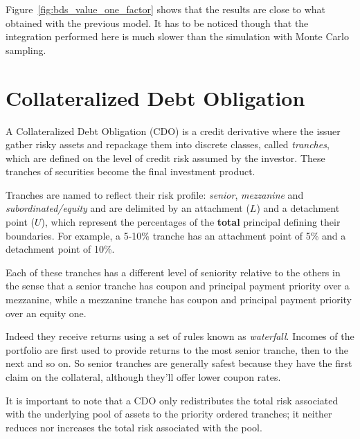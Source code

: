 Figure~\ref{fig:bds_value_one_factor} shows that the results are close to what obtained with the previous model. It has to be noticed though that the integration performed here is much slower than the simulation with Monte Carlo sampling.

\section{Collateralized Debt Obligation}
\label{collateralized-debt-obligation}

A Collateralized Debt Obligation (CDO) is a credit derivative where the issuer gather risky assets and repackage them into discrete classes, called \emph{tranches}, which are defined on the level of credit risk assumed by the investor. These tranches of securities become the final investment product.

Tranches are named to reflect their risk profile: \emph{senior}, \emph{mezzanine} and \emph{subordinated/equity} and are delimited by an attachment ($L$) and a detachment point ($U$), which represent the percentages of the \textbf{total} principal defining their boundaries. For example, a 5-10\% tranche has an attachment point of 5\% and a detachment point of 10\%. 

Each of these tranches has a different level of seniority relative to the others in the sense that a senior tranche has coupon and principal payment priority over a mezzanine, while a mezzanine tranche has coupon and principal payment priority over an equity one. 

Indeed they receive returns using a set of rules known as \emph{waterfall}. Incomes of the portfolio are first used to provide returns to the most senior tranche, then to the next and so on. So senior tranches are generally safest because they have the first claim on the collateral, although they'll offer lower coupon rates.

It is important to note that a CDO only redistributes the total risk associated with the underlying pool of assets to the priority ordered tranches; it neither reduces nor increases the total risk associated with the pool.

